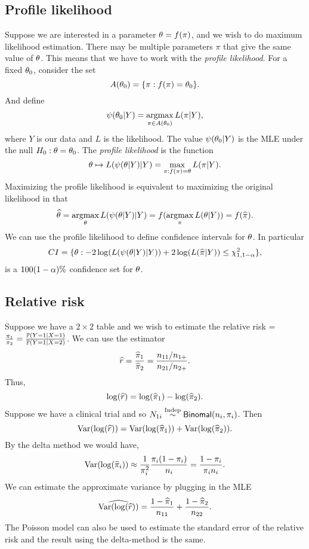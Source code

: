 \subsection{Profile likelihood}
Suppose we are interested in a parameter ${\theta} = f(\pi)$, and we wish to do maximum likelihood estimation. There may be multiple parameters $\pi$ that give the same value of ${\theta}$. This means that we have to work with the \emph{profile likelihood}. For a fixed ${\theta}_0$, consider the set 
\[A({\theta}_0) = \{ \pi : f(\pi)={\theta}_0\}.\]
And define 
\[\psi({\theta}_0|Y) = \operatorname*{argmax}_{\pi \in A({\theta}_0)} L(\pi|Y), \]
where $Y$ is our data and $L$ is the likelihood. The value $\psi({\theta}_0|Y)$ is the MLE under the null $H_0 : {\theta} = {\theta}_0$. The \emph{profile likelihood} is the function 
\[{\theta} \mapsto L(\psi({\theta} | Y)|Y) = \max_{\pi : f(\pi) = {\theta}} L(\pi | Y). \]
Maximizing the profile likelihood is equivalent to maximizing the original likelihood in that
\[\widehat{{\theta}} = \operatorname*{argmax}_{{\theta}} L(\psi({\theta}|Y)|Y) = f(\operatorname*{argmax}_\pi L({\theta}|Y))=f(\widehat{\pi}). \]
We can use the profile likelihood to define confidence intervals for ${\theta}$. In particular 
\[CI=\{{\theta} : -2\log(L(\psi({\theta}|Y)|Y)) +2\log(L(\widehat{\pi}|Y)) \le \chi^2_{1,1-{\alpha}}\}, \]
is a $100(1-{\alpha})\%$ confidence set for ${\theta}$.
\subsection{Relative risk}
Suppose we have a $2\times 2$ table and we wish to estimate the relative risk = $\frac{\pi_1}{\pi_2} = \frac{{\mathbb{P}}(Y=1|X=1)}{{\mathbb{P}}(Y=1|X=2)}$. We can use the estimator
\[\widehat{r} = \frac{\widehat{\pi}_1}{\widehat{\pi}_2} = \frac{n_{11}/n_{1+}}{n_{21}/n_{2+}}. \]
Thus,
\[ \log(\widehat{r}) = \log(\widehat{\pi}_1)-\log(\widehat{\pi}_2).\]
Suppose we have a clinical trial and so $N_{1i} \stackrel{\text{Indep}}{\sim} \mathsf{Binomal}(n_i,\pi_i)$. Then
\[\operatorname{Var}(\log(\widehat{r})) = \operatorname{Var}(\log(\widehat{\pi}_1))+\operatorname{Var}(\log(\widehat{\pi}_2)). \]
By the delta method we would have, 
\[\operatorname{Var}(\log(\widehat{\pi}_i)) \approx \frac{1}{\pi_i^2}\frac{\pi_i(1-\pi_i)}{n_i} = \frac{1-\pi_i}{\pi_i n_i}. \]
We can estimate the approximate variance by plugging in the MLE
\[\widehat{\operatorname{Var}(\log(\widehat{r}))} = \frac{1-\widehat{\pi}_1}{n_{11}}+\frac{1-\widehat{\pi}_2}{n_{22}}. \]
The Poisson model can also be used to estimate the standard error of the relative risk and the result using the delta-method is the same.
